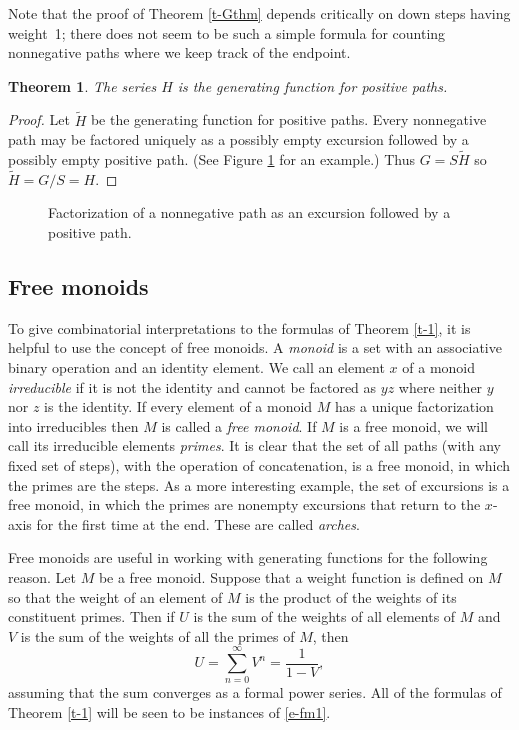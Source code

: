 \documentclass[12pt,reqno, oneside]{amsart}
\newtheorem{thm}{Theorem}[section]
\newcommand{\Ht}{\tilde H}
\begin{document}
Note that the proof of Theorem \ref{t-Gthm} depends critically on down steps having weight~1; there does not seem to be such a simple formula for counting nonnegative paths where we keep track of the endpoint.


\begin{thm} 
The  series $H$ is the generating function for positive paths.
\end{thm}
\begin{proof}
Let $\Ht$  be the generating function for positive paths.
Every nonnegative path may be factored uniquely as a possibly empty excursion followed by a possibly empty positive path. (See Figure \ref{f-label2} for an example.)
Thus $G=S\Ht$ so $\Ht = G/S=H$.
\end{proof}



\begin{figure}[h]
\caption{Factorization of a nonnegative path as an excursion followed by a positive path.}
\label{f-label2}
\end{figure}

\subsection{Free monoids}
To give combinatorial interpretations to the formulas of Theorem \ref{t-1}, it is helpful to use the concept of free monoids.
A \emph{monoid} is a set with an associative binary operation and an identity element. 
We call an element $x$ of a monoid \emph{irreducible} if it is not the identity and cannot be factored as $yz$ where neither $y$ nor $z$ is the identity. If every element of a monoid $M$ has a unique factorization into irreducibles then $M$ is called a \emph{free monoid}. If $M$ is a free monoid, we will call its irreducible elements \emph{primes}. It is clear that the set of all paths (with any fixed set of steps), with the operation of concatenation, is a free monoid, in which the primes are the steps. As a more interesting example, the set of excursions is a free monoid, in which the primes are nonempty excursions that return to the $x$-axis for the first time at the end. These are  called \emph{arches}.

Free monoids are useful in working with generating functions for the following reason. Let $M$ be a free monoid. Suppose that a weight function is defined on $M$ so that the weight of an element of $M$ is the product of the weights of its constituent primes. Then if $U$ is the sum of the weights of all elements of $M$ and $V$ is the sum of the weights of all the primes of $M$, then
\begin{equation}
\label{e-fm1}
U = \sum_{n=0}^\infty V^n = \frac{1}{1-V},
\end{equation}
assuming that the sum converges as a formal power series. 
All of the formulas of Theorem \ref{t-1} will be seen to be instances of \eqref{e-fm1}.
\end{document}
